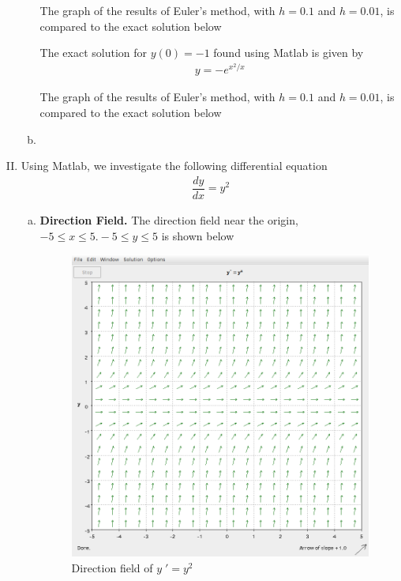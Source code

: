 \documentclass[a4paper,12pt]{article}
\begin{document}
\begin{enumerate}[I.]
\begin{enumerate}[a)]
      The graph of the results of Euler's method, with $h=0.1$ and $h=0.01$, is compared to the exact solution below
      
      
      The exact solution for $y(0)=-1$ found using Matlab is given by
      \begin{align*}
        y=-e^{x^2/x}
      \end{align*}

      The graph of the results of Euler's method, with $h=0.1$ and $h=0.01$, is compared to the exact solution below
      
    
    \item
  \end{enumerate}

  \item Using Matlab, we investigate the following differential equation
  \begin{align*}
    \dfrac{dy}{dx} = y^2
  \end{align*}
  \begin{enumerate}[a)]
    \item \textbf{Direction Field.} The direction field near the origin, $-5 \leq x \leq 5. -5 \leq y \leq 5$ is shown below
    \begin{figure}[H]
      \begin{center}
        \includegraphics[scale=.3]{21.png}
        \caption{Direction field of $y\;' = y^2$}
        \label{fig:3}
      \end{center}
    \end{figure}
    

\end{enumerate}
\end{enumerate}
\end{document}
